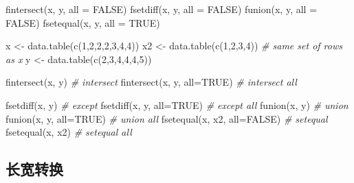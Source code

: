 \documentclass[
]{book}
\newenvironment{Shaded}{\begin{snugshade}}{\end{snugshade}}
\newcommand{\AttributeTok}[1]{\textcolor[rgb]{0.77,0.63,0.00}{#1}}
\newcommand{\CommentTok}[1]{\textcolor[rgb]{0.56,0.35,0.01}{\textit{#1}}}
\newcommand{\ConstantTok}[1]{\textcolor[rgb]{0.00,0.00,0.00}{#1}}
\newcommand{\DecValTok}[1]{\textcolor[rgb]{0.00,0.00,0.81}{#1}}
\newcommand{\FunctionTok}[1]{\textcolor[rgb]{0.00,0.00,0.00}{#1}}
\newcommand{\NormalTok}[1]{#1}
\newcommand{\OtherTok}[1]{\textcolor[rgb]{0.56,0.35,0.01}{#1}}
\begin{document}
\begin{Shaded}
\begin{Highlighting}[]

\FunctionTok{fintersect}\NormalTok{(x, y, }\AttributeTok{all =} \ConstantTok{FALSE}\NormalTok{)}
\FunctionTok{fsetdiff}\NormalTok{(x, y, }\AttributeTok{all =} \ConstantTok{FALSE}\NormalTok{)}
\FunctionTok{funion}\NormalTok{(x, y, }\AttributeTok{all =} \ConstantTok{FALSE}\NormalTok{)}
\FunctionTok{fsetequal}\NormalTok{(x, y, }\AttributeTok{all =} \ConstantTok{TRUE}\NormalTok{)}

\NormalTok{x }\OtherTok{\textless{}{-}}  \FunctionTok{data.table}\NormalTok{(}\FunctionTok{c}\NormalTok{(}\DecValTok{1}\NormalTok{,}\DecValTok{2}\NormalTok{,}\DecValTok{2}\NormalTok{,}\DecValTok{2}\NormalTok{,}\DecValTok{3}\NormalTok{,}\DecValTok{4}\NormalTok{,}\DecValTok{4}\NormalTok{))}
\NormalTok{x2 }\OtherTok{\textless{}{-}}  \FunctionTok{data.table}\NormalTok{(}\FunctionTok{c}\NormalTok{(}\DecValTok{1}\NormalTok{,}\DecValTok{2}\NormalTok{,}\DecValTok{3}\NormalTok{,}\DecValTok{4}\NormalTok{)) }\CommentTok{\# same set of rows as x}
\NormalTok{y }\OtherTok{\textless{}{-}}  \FunctionTok{data.table}\NormalTok{(}\FunctionTok{c}\NormalTok{(}\DecValTok{2}\NormalTok{,}\DecValTok{3}\NormalTok{,}\DecValTok{4}\NormalTok{,}\DecValTok{4}\NormalTok{,}\DecValTok{4}\NormalTok{,}\DecValTok{5}\NormalTok{))}

\FunctionTok{fintersect}\NormalTok{(x, y)            }\CommentTok{\# intersect}
\FunctionTok{fintersect}\NormalTok{(x, y, }\AttributeTok{all=}\ConstantTok{TRUE}\NormalTok{)  }\CommentTok{\# intersect all}

\FunctionTok{fsetdiff}\NormalTok{(x, y)              }\CommentTok{\# except}
\FunctionTok{fsetdiff}\NormalTok{(x, y, }\AttributeTok{all=}\ConstantTok{TRUE}\NormalTok{)    }\CommentTok{\# except all}
\FunctionTok{funion}\NormalTok{(x, y)                }\CommentTok{\# union}
\FunctionTok{funion}\NormalTok{(x, y, }\AttributeTok{all=}\ConstantTok{TRUE}\NormalTok{)      }\CommentTok{\# union all}
\FunctionTok{fsetequal}\NormalTok{(x, x2, }\AttributeTok{all=}\ConstantTok{FALSE}\NormalTok{) }\CommentTok{\# setequal}
\FunctionTok{fsetequal}\NormalTok{(x, x2)            }\CommentTok{\# setequal all}
\end{Highlighting}
\end{Shaded}

\hypertarget{ux957fux5bbdux8f6cux6362}{%
\subsection{长宽转换}\label{ux957fux5bbdux8f6cux6362}}
\end{document}
